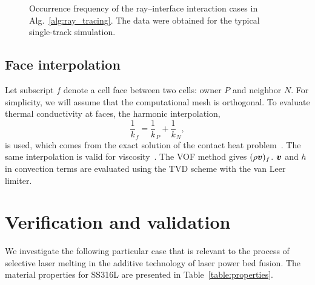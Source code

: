 \documentclass[final]{elsarticle} %
\newcommand{\bv}{\vb*{v}}
\begin{document}
\begin{figure}
    \centering
    \footnotesize
    \caption{
        Occurrence frequency of the ray--interface interaction cases in Alg.~\ref{alg:ray_tracing}.
        The data were obtained for the typical single-track simulation.
    }
    \label{fig:case_frequency}
\end{figure}

\subsection{Face interpolation}

Let subscript $f$ denote a cell face between two cells: owner $P$ and neighbor $N$.
For simplicity, we will assume that the computational mesh is orthogonal.
To evaluate thermal conductivity at faces, the harmonic interpolation,
\begin{equation}\label{eq:k_harmonic}
    \frac1k_f = \frac1k_P + \frac1k_N,
\end{equation}
is used, which comes from the exact solution of the contact heat problem~\cite{fedorenko1975difference,patankar1980numerical}.
The same interpolation is valid for viscosity~\cite{kothe1998perspective}.
The VOF method gives $(\rho\bv)_f$.
$\bv$ and $h$ in convection terms are evaluated using the TVD scheme with the van Leer limiter.


\section{Verification and validation}

We investigate the following particular case that is relevant to the process of selective laser melting in the additive technology of laser power bed fusion. The material properties for SS316L are presented in Table~\ref{table:properties}.
\end{document}
